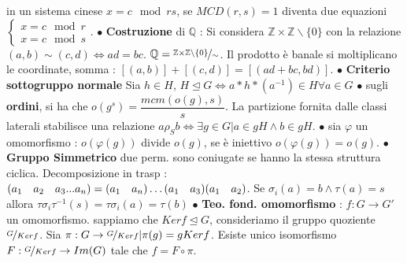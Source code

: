 \documentclass[1pt, letterpaper]{article}
\newcommand{\Z}{{\mathbb Z}}
\newcommand{\spaz}{{\text{\hphantom{aa}}}}
\newcommand{\norm}{{\unlhd}}
\newcommand{\fdot}{{\(\bullet\) }}
\begin{document}
in un sistema cinese \(x=c \mod rs\), se \(MCD(r,s)=1\) diventa due equazioni \(\begin{cases}
    x=c\mod r\\x=c\mod s
   \end{cases}\).
   \fdot \textbf{Costruzione} di \(\mathbb{Q}\) : Si considera \(\Z\times \Z\backslash \{0\}\) con la relazione \((a,b)\sim(c,d)\iff ad=bc\). \(\mathbb{Q}=\nicefrac{\Z\times \Z\backslash \{0\}}{\sim}\). Il prodotto è banale 
   si moltiplicano le coordinate, somma : \([(a,b)]+[(c,d)]=[(ad+bc,bd)]\). \fdot \color{red}\textbf{Criterio sottogruppo normale} \color{black} Sia \(h\in H\), \(H\norm G\iff a*h*(a^{-1})\in H \forall a\in G\) \fdot sugli \textbf{ordini},
   si ha che \(o(g^s)=\dfrac{mcm(o(g),s)}{s}\). La partizione fornita dalle classi laterali stabilisce una relazione \(a\rho_S b\iff \exists g\in G|a\in gH\land b\in gH\). 
   \fdot sia \(\varphi\) un omomorfismo : \(o(\varphi(g)) \) divide \(o(g)\), se è iniettivo  \(o(\varphi(g))=o(g)\). 
   \fdot \textbf{Gruppo Simmetrico} due perm. sono coniugate se hanno la stessa struttura ciclica. Decomposizione in trasp : \((a_1\spaz a_2\spaz a_3...a_n)=(a_1\spaz a_n)\dots(a_1\spaz a_3)(a_1\spaz a_2)\).
   Se \(\sigma_i(a)=b\land \tau(a)=s\) allora \(\tau\sigma_i\tau^{-1}(s)=\tau\sigma_i(a)=\tau(b)\)
   \fdot \textbf{Teo. fond. omomorfismo} : \(f:G\rightarrow G'\) un omomorfismo. sappiamo che \(Kerf\norm G\), consideriamo il gruppo quoziente \(\nicefrac{G}{Kerf}\). Sia \(\pi :G\rightarrow \nicefrac{G}{Kerf}|
   \pi(g)=gKerf\). Esiste unico isomorfismo \(F:\nicefrac{G}{Kerf}\rightarrow Im(G)\) tale che \(f=F\circ \pi\). 
   
   
   
\end{document}

